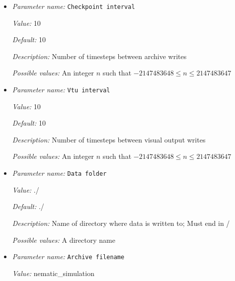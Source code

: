 \begin{itemize}
\item {\it Parameter name:} {\tt Checkpoint interval}
\label{parameters:NematicSystemMPIDriver/File output/Checkpoint interval}
\label{parameters:NematicSystemMPIDriver/File_20output/Checkpoint_20interval}


{\it Value:} 10


{\it Default:} 10


{\it Description:} Number of timesteps between archive writes


{\it Possible values:} An integer $n$ such that $-2147483648\leq n \leq 2147483647$
\item {\it Parameter name:} {\tt Vtu interval}
\label{parameters:NematicSystemMPIDriver/File output/Vtu interval}
\label{parameters:NematicSystemMPIDriver/File_20output/Vtu_20interval}


{\it Value:} 10


{\it Default:} 10


{\it Description:} Number of timesteps between visual output writes


{\it Possible values:} An integer $n$ such that $-2147483648\leq n \leq 2147483647$
\item {\it Parameter name:} {\tt Data folder}
\label{parameters:NematicSystemMPIDriver/File output/Data folder}
\label{parameters:NematicSystemMPIDriver/File_20output/Data_20folder}


{\it Value:} ./


{\it Default:} ./


{\it Description:} Name of directory where data is written to; Must end in /


{\it Possible values:} A directory name
\item {\it Parameter name:} {\tt Archive filename}
\label{parameters:NematicSystemMPIDriver/File output/Archive filename}
\label{parameters:NematicSystemMPIDriver/File_20output/Archive_20filename}


{\it Value:} nematic\_simulation



\end{itemize}
